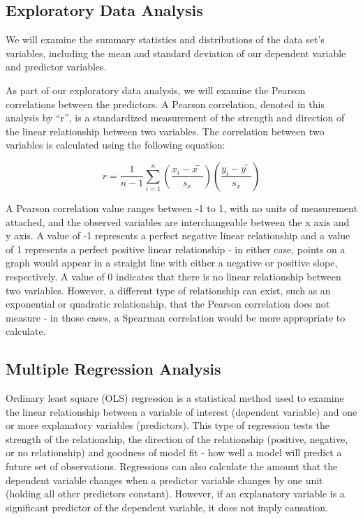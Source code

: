 \documentclass[
]{article}
\begin{document}
\hypertarget{exploratory-data-analysis}{%
\subsection{Exploratory Data Analysis}\label{exploratory-data-analysis}}

We will examine the summary statistics and distributions of the data
set's variables, including the mean and standard deviation of our
dependent variable and predictor variables.

As part of our exploratory data analysis, we will examine the Pearson
correlations between the predictors. A Pearson correlation, denoted in
this analysis by ``r'', is a standardized measurement of the strength
and direction of the linear relationship between two variables. The
correlation between two variables is calculated using the following
equation:

\[r=\frac{1}{n-1}\sum_{i=1}^{n}\left(\frac{x_i-x ̅}{s_x}\right)\left(\frac{y_i-y ̅}{s_x}\right)\]

A Pearson correlation value ranges between -1 to 1, with no units of
measurement attached, and the observed variables are interchangeable
between the x axis and y axis. A value of -1 represents a perfect
negative linear relationship and a value of 1 represents a perfect
positive linear relationship - in either case, points on a graph would
appear in a straight line with either a negative or positive slope,
respectively. A value of 0 indicates that there is no linear
relationship between two variables. However, a different type of
relationship can exist, such as an exponential or quadratic
relationship, that the Pearson correlation does not measure - in those
cases, a Spearman correlation would be more appropriate to calculate.

\hypertarget{multiple-regression-analysis}{%
\subsection{Multiple Regression
Analysis}\label{multiple-regression-analysis}}

Ordinary least square (OLS) regression is a statistical method used to
examine the linear relationship between a variable of interest
(dependent variable) and one or more explanatory variables (predictors).
This type of regression tests the strength of the relationship, the
direction of the relationship (positive, negative, or no relationship)
and goodness of model fit - how well a model will predict a future set
of observations. Regressions can also calculate the amount that the
dependent variable changes when a predictor variable changes by one unit
(holding all other predictors constant). However, if an explanatory
variable is a significant predictor of the dependent variable, it does
not imply causation.
\end{document}
